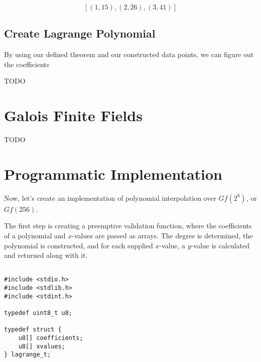 \documentclass{article}
\begin{document}
$$
[(1, 15), (2, 26), (3, 41)]
$$

\subsection{Create Lagrange Polynomial}

By using our defined theorem and our constructed data points, we can figure out the coefficients

TODO

\section{Galois Finite Fields}

TODO

\section{Programmatic Implementation}

Now, let's create an implementation of polynomial interpolation over $Gf(2^8)$, or $Gf(256)$.

The first step is creating a preemptive validation function, where the coefficients of a polynomial and $x$-values are passed as arrays. The degree is determined, the polynomial is constructed, and for each supplied $x$-value, a $y$-value is calculated and returned along with it.

\begin{lstlisting}

#include <stdio.h>
#include <stdlib.h>
#include <stdint.h>

typedef uint8_t u8;

typedef struct {
    u8[] coefficients;
    u8[] xvalues;
} lagrange_t;




\end{lstlisting}
\end{document}
